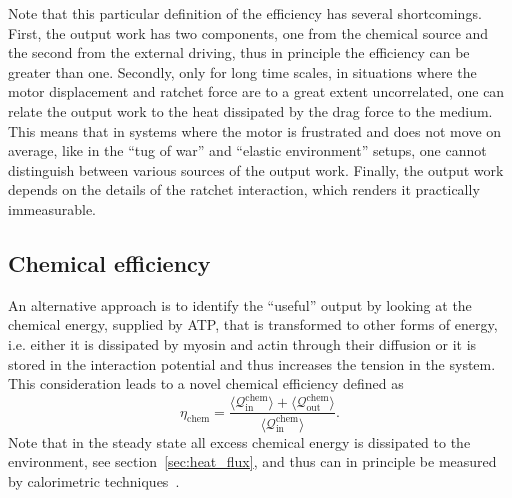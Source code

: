 \documentclass[aps,pre,twocolumn,showpacs,showkeys,superscriptaddress,floatfix]{revtex4-1}
\begin{document}
Note that this particular definition of the efficiency has several shortcomings.
First, the output work has two components, one from the chemical source and the second from the external driving, 
thus in principle the efficiency can be greater than one. 
Secondly, 
only for long time scales, in situations where the motor displacement and ratchet force are to a great extent uncorrelated, 
one can relate the output work to the heat dissipated by the drag force to the medium.
This means that in systems where the motor is frustrated and does not move on average, 
like in the ``tug of war'' and ``elastic environment'' setups,
one cannot distinguish between various sources of the output work. 
Finally, the output work depends on the details of the ratchet interaction, which renders it practically immeasurable.


\subsection{Chemical efficiency} 
\label{sec:chemical_efficiency}
An alternative approach is to identify the ``useful'' output by looking at the chemical energy, supplied by ATP, that is transformed to other forms of energy, 
i.e. either it is dissipated by myosin and actin through their diffusion or it is stored in the interaction potential and thus increases the tension in the system. 
This consideration leads to a novel chemical efficiency defined as 
\begin{equation}
\eta_\text{chem} = \frac{\langle\mathcal Q^\text{chem}_\text{in}\rangle+\langle\mathcal Q^\text{chem}_\text{out}\rangle}{\langle\mathcal Q^\text{chem}_\text{in}\rangle} .
\label{eq:efficiency}
\end{equation}
Note that in the steady state all excess chemical energy is dissipated to the environment, see section~\ref{sec:heat_flux}, 
and thus can in principle be measured by calorimetric techniques~\cite{Maskow2015}.  
\end{document}
